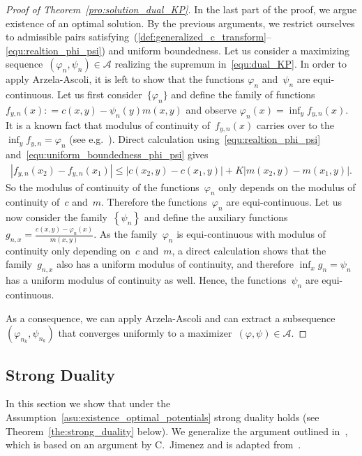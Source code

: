 \documentclass{article}
\theoremstyle{definition}
\begin{document}
\begin{proof}[Proof of Theorem~\ref{pro:solution_dual_KP}]
In the last part of the proof, we argue existence of an optimal solution. By the previous arguments, we restrict ourselves to admissible pairs satisfying~(\ref{def:generalized_c_transform}--\ref{equ:realtion_phi_psi}) and uniform boundedness. Let us consider a maximizing sequence~$(\varphi_n , \psi_n) \in \mathcal{A}$ realizing the supremum in~\eqref{equ:dual_KP}. In order to apply Arzela-Ascoli, it is left to show that the functions $\varphi_n$ and~$\psi_n$ are equi-continuous. Let us first consider~$\{\varphi_n\}$ and define the family of functions~$f_{y,n} (x) : = c(x,y) - \psi_n(y) m(x,y)$ and observe $\varphi_n(x) = \inf_{y} f_{y,n} (x)$. It is a known fact that modulus of continuity of~$f_{y,n}(x)$ carries over to the~$\inf_{y} f_{y,n} = \varphi_n$ (see e.g.~\cite[Box 1.5]{santambrogio2015otam}). Direct calculation using~\eqref{equ:realtion_phi_psi} and~\eqref{equ:uniform_boundedness_phi_psi} gives
\begin{align}\label{equ:modulus_continuity}
    |f_{y,n} (x_2) - f_{y,n} (x_1)| \leq | c(x_2,y) - c(x_1,y)| + K  |m(x_2,y) - m(x_1,y)|  .
\end{align}
So the modulus of continuity of the functions~$\varphi_n$ only depends on the modulus of continuity of~$c$ and~$m$. Therefore the functions~$\varphi_n$ are equi-continuous. 
Let us now consider the family~$\left\{ \psi_n \right\}$ and define the auxiliary functions $g_{n,x} = \frac{c(x,y) - \varphi_n(x)}{m(x,y)}$. As the family~$\varphi_n$ is equi-continuous with modulus of continuity only depending on~$c$ and~$m$, a direct calculation shows that the family~$g_{n,x}$ also has a uniform modulus of continuity, and therefore $\inf_{x} g_n = \psi_n$ has a uniform modulus of continuity as well. Hence, the functions~$\psi_n$ are equi-continuous.

As a consequence, we can apply Arzela-Ascoli and can extract a subsequence~$(\varphi_{n_k}, \psi_{n_k})$ that converges uniformly to a maximizer~$(\varphi, \psi) \in \mathcal{A}$.
\end{proof}


\subsection{Strong Duality} \label{sec:strong_duality}


In this section we show that under the Assumption~\ref{asu:existence_optimal_potentials} strong duality holds (see Theorem~\ref{the:strong_duality} below). We generalize the argument outlined in~\cite[Section~1.6.2]{santambrogio2015otam}, which is based on an argument by C.~Jimenez and is adapted from~\cite[Section~4]{bouchitte2001characterization}.
\end{document}
